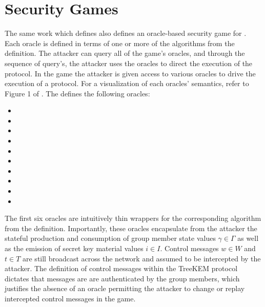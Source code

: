 \hypertarget{sec:security-games}{%
\section{Security Games}\label{sec:security-games}}

The same work which defines  also defines an oracle-based security game for .
Each oracle is defined in terms of one or more of the algorithms from the \CGKAdef definition.
The attacker can query all of the game's oracles, and through the sequence of query's, the attacker uses the oracles to direct the execution of the  protocol.
In the game the attacker is given access to various oracles to drive the execution of a  protocol.
For a visualization of each oracles' semantics, refer to Figure 1 of \autocite{alwen2020security}.
The \CGKAsec defines the following oracles:

\begin{itemize}
\item {}
\item {}
\item {}
\item {}
\item {}
\item {}
\item {}
\item {}
\item {}
\item {}
\end{itemize}

The first six oracles are intuitively thin wrappers for the corresponding algorithm from the \CGKAdef definition.
Importantly, these oracles encapsulate from the attacker the stateful production and consumption of group member state values \(\gamma \in \Gamma\) as well as the emission of secret key material values \(i \in I\).
Control messages \(w \in W\) and \(t \in T\) are still broadcast across the network and assumed to be intercepted by the attacker.
The definition of control messages within the TreeKEM protocol dictates that messages are are authenticated by the group members, which justifies the absence of an oracle permitting the attacker to change or replay intercepted control messages in the  game.

